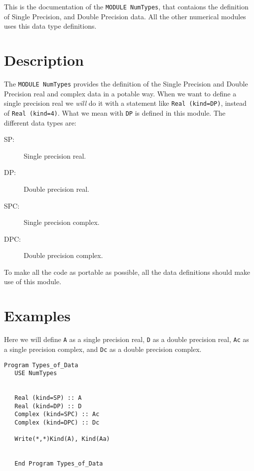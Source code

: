 This is the documentation of the \texttt{MODULE NumTypes}, that
contaions the definition of Single Precision, and Double
Precision data. All the other numerical modules uses this data type
definitions. 


\section{Description}

The \texttt{MODULE NumTypes} provides the definition of the Single
Precision and Double Precision real and complex data in a potable
way. When we want to define a single precision real we \emph{will} do
it with a statement like \texttt{Real (kind=DP)}, instead of
\texttt{Real (kind=4)}. What we mean with \texttt{DP} is defined in
this module. The different data types are:

\begin{description}
\item[SP: ] Single precision real.
\item[DP: ] Double precision real.
\item[SPC: ] Single precision complex.
\item[DPC: ] Double precision complex.
\end{description}

To make all the code as portable as possible, all the data
definitions should make use of this module.

\section{Examples}

Here we will define \texttt{A} as a single precision real, \texttt{D}
as a double precision real, \texttt{Ac} as a single precision complex,
and \texttt{Dc} as a double precision complex.


\begin{lstlisting}[emph=DP,moreemph=SP,moreemph=DPC,moreemph=SPC,emphstyle=\color{blue},frame=trBL,caption=Definition
  of data types.,
  label=Numtypes]
   Program Types_of_Data
   USE NumTypes


   Real (kind=SP) :: A
   Real (kind=DP) :: D
   Complex (kind=SPC) :: Ac
   Complex (kind=DPC) :: Dc

   Write(*,*)Kind(A), Kind(Aa)


   End Program Types_of_Data
\end{lstlisting}



